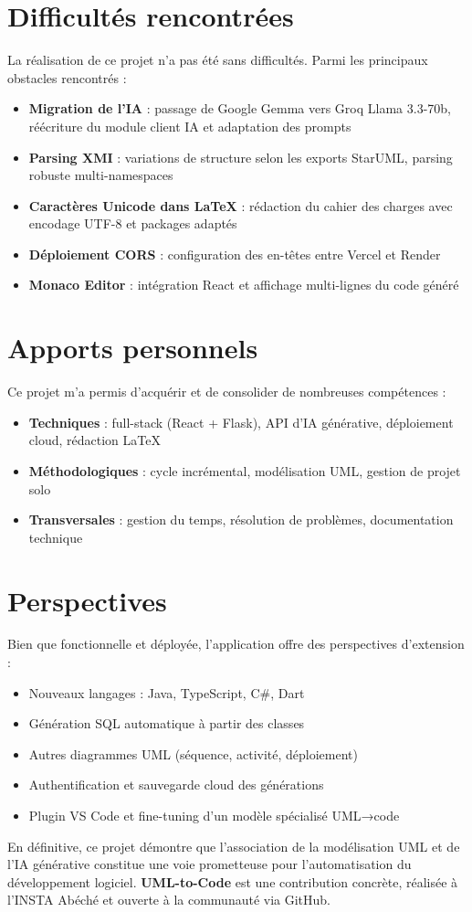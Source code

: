 \section*{Difficultés rencontrées}

La réalisation de ce projet n'a pas été sans difficultés. Parmi les principaux obstacles rencontrés :

\begin{itemize}
    \item \textbf{Migration de l'IA} : passage de Google Gemma vers Groq Llama 3.3-70b, réécriture du module client IA et adaptation des prompts
    \item \textbf{Parsing XMI} : variations de structure selon les exports StarUML, parsing robuste multi-namespaces
    \item \textbf{Caractères Unicode dans \LaTeX} : rédaction du cahier des charges avec encodage UTF-8 et packages adaptés
    \item \textbf{Déploiement CORS} : configuration des en-têtes entre Vercel et Render
    \item \textbf{Monaco Editor} : intégration React et affichage multi-lignes du code généré
\end{itemize}

\section*{Apports personnels}

Ce projet m'a permis d'acquérir et de consolider de nombreuses compétences :

\begin{itemize}
    \item \textbf{Techniques} : full-stack (React + Flask), API d'IA générative, déploiement cloud, rédaction \LaTeX
    \item \textbf{Méthodologiques} : cycle incrémental, modélisation UML, gestion de projet solo
    \item \textbf{Transversales} : gestion du temps, résolution de problèmes, documentation technique
\end{itemize}

\section*{Perspectives}

Bien que fonctionnelle et déployée, l'application offre des perspectives d'extension :

\begin{itemize}
    \item Nouveaux langages : Java, TypeScript, C\#, Dart
    \item Génération SQL automatique à partir des classes
    \item Autres diagrammes UML (séquence, activité, déploiement)
    \item Authentification et sauvegarde cloud des générations
    \item Plugin VS Code et fine-tuning d'un modèle spécialisé UML→code
\end{itemize}

En définitive, ce projet démontre que l'association de la modélisation UML et de l'IA générative constitue une voie prometteuse pour l'automatisation du développement logiciel. \textbf{UML-to-Code} est une contribution concrète, réalisée à l'INSTA Abéché et ouverte à la communauté via GitHub.
